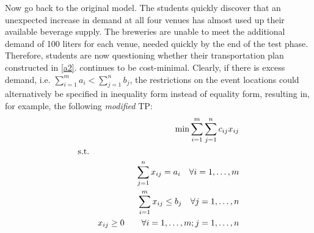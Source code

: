 Now go back to the original model. The students quickly discover that an unexpected increase in demand at all four venues has almost used up their available beverage supply. The breweries are unable to meet the additional demand of 100 liters for each venue, needed quickly by the end of the test phase. Therefore, students are now questioning whether their transportation plan constructed in \ref{a2}. continues to be cost-minimal. Clearly, if there is excess demand, i.e. $\sum_{i=1}^{m} a_i < \sum_{j=1}^{n} b_j$, the restrictions on the event locations could alternatively be specified in inequality form instead of equality form, resulting in, for example, the following \emph{modified} TP:
	\begin{eqnarray}\setcounter{equation}{1}
	&&\min \sum_{i=1}^m\sum_{j=1}^n c_{ij} x_{ij} \label{TP1} \\
	\mbox{s.t.}&& \nonumber \\
	&&\sum_{j=1}^n x_{ij} = a_i \quad \forall i=1,\ldots,m \label{TP2}\\
	&&\sum_{i=1}^m x_{ij} \leq b_j \quad \forall j=1,\ldots,n \label{TP3}\\
	&&x_{ij} \geq 0\qquad \forall i=1,\ldots,m; j=1,\ldots,n \label{TP4}
	\end{eqnarray}
